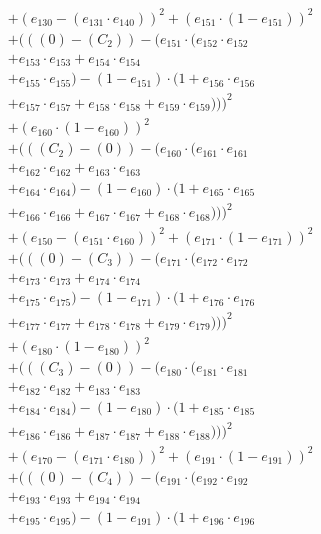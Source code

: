 \documentclass[10pt, a4paper]{article}
\begin{document}
\begin{small}
\begin{align*}
& + (e_{130} - (e_{131} \cdot e_{140}))^{2} + (e_{151} \cdot (1 - e_{151}))^{2} \\
& + (((0) - (C_{2})) - (e_{151} \cdot (e_{152} \cdot e_{152} \\
& + e_{153} \cdot e_{153} + e_{154} \cdot e_{154} \\
& + e_{155} \cdot e_{155}) - (1 - e_{151}) \cdot (1 + e_{156} \cdot e_{156} \\
& + e_{157} \cdot e_{157} + e_{158} \cdot e_{158} + e_{159} \cdot e_{159})))^{2} \\
& + (e_{160} \cdot (1 - e_{160}))^{2} \\
& + (((C_{2}) - (0)) - (e_{160} \cdot (e_{161} \cdot e_{161} \\
& + e_{162} \cdot e_{162} + e_{163} \cdot e_{163} \\
& + e_{164} \cdot e_{164}) - (1 - e_{160}) \cdot (1 + e_{165} \cdot e_{165} \\
& + e_{166} \cdot e_{166} + e_{167} \cdot e_{167} + e_{168} \cdot e_{168})))^{2} \\
& + (e_{150} - (e_{151} \cdot e_{160}))^{2} + (e_{171} \cdot (1 - e_{171}))^{2} \\
& + (((0) - (C_{3})) - (e_{171} \cdot (e_{172} \cdot e_{172} \\
& + e_{173} \cdot e_{173} + e_{174} \cdot e_{174} \\
& + e_{175} \cdot e_{175}) - (1 - e_{171}) \cdot (1 + e_{176} \cdot e_{176} \\
& + e_{177} \cdot e_{177} + e_{178} \cdot e_{178} + e_{179} \cdot e_{179})))^{2} \\
& + (e_{180} \cdot (1 - e_{180}))^{2} \\
& + (((C_{3}) - (0)) - (e_{180} \cdot (e_{181} \cdot e_{181} \\
& + e_{182} \cdot e_{182} + e_{183} \cdot e_{183} \\
& + e_{184} \cdot e_{184}) - (1 - e_{180}) \cdot (1 + e_{185} \cdot e_{185} \\
& + e_{186} \cdot e_{186} + e_{187} \cdot e_{187} + e_{188} \cdot e_{188})))^{2} \\
& + (e_{170} - (e_{171} \cdot e_{180}))^{2} + (e_{191} \cdot (1 - e_{191}))^{2} \\
& + (((0) - (C_{4})) - (e_{191} \cdot (e_{192} \cdot e_{192} \\
& + e_{193} \cdot e_{193} + e_{194} \cdot e_{194} \\
& + e_{195} \cdot e_{195}) - (1 - e_{191}) \cdot (1 + e_{196} \cdot e_{196} \\

\end{align*}
\end{small}
\end{document}
